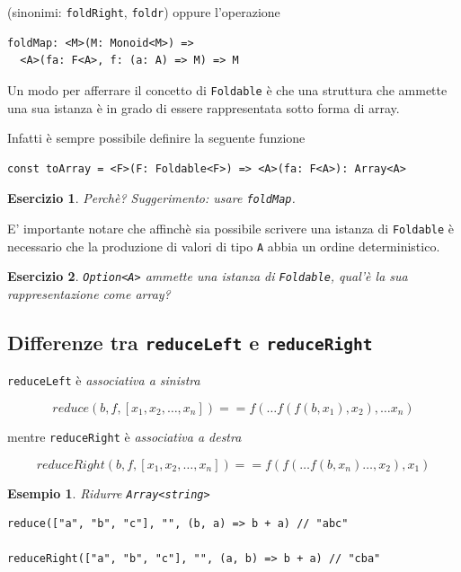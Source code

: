 \documentclass[12pt]{article}
\newtheorem{example}{Esempio}[section]
\newtheorem{exercise}{Esercizio}[section]
\begin{document}
(sinonimi: \texttt{foldRight}, \texttt{foldr}) oppure l'operazione

\begin{verbatim}
foldMap: <M>(M: Monoid<M>) =>
  <A>(fa: F<A>, f: (a: A) => M) => M
\end{verbatim}

Un modo per afferrare il concetto di \texttt{Foldable} è che una struttura che ammette una sua istanza
è in grado di essere rappresentata sotto forma di array.

Infatti è sempre possibile definire la seguente funzione

\begin{verbatim}
const toArray = <F>(F: Foldable<F>) => <A>(fa: F<A>): Array<A>
\end{verbatim}

\begin{exercise}
Perchè? Suggerimento: usare \texttt{foldMap}.
\end{exercise}

E' importante notare che affinchè sia possibile scrivere una istanza di \texttt{Foldable} è necessario che la produzione di valori
di tipo \texttt{A} abbia un ordine deterministico.

\begin{exercise}
\texttt{Option<A>} ammette una istanza di \texttt{Foldable}, qual'è la sua rappresentazione come array?
\end{exercise}

\subsection{Differenze tra \texttt{reduceLeft} e \texttt{reduceRight}}

\texttt{reduceLeft} è \emph{associativa a sinistra}

$$
reduce(b, f, [x_1, x_2, \ldots , x_n])  == f( \ldots f(f(b, x_1), x_2), \ldots x_n)
$$

mentre \texttt{reduceRight} è \emph{associativa a destra}

$$
reduceRight(b, f, [x_1, x_2, \ldots , x_n])  == f(f( \ldots f(b, x_n) \ldots , x_2), x_1)
$$

\begin{example}
Ridurre \texttt{Array<string>}

\begin{verbatim}
reduce(["a", "b", "c"], "", (b, a) => b + a) // "abc"

reduceRight(["a", "b", "c"], "", (a, b) => b + a) // "cba"
\end{verbatim}
\end{example}
\end{document}
